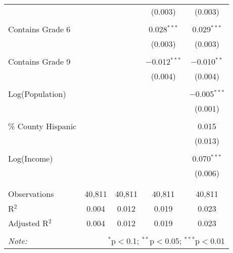 \begin{table}[!htbp]
\begin{tabular}{@{\extracolsep{-2pt}}lcccc}
  &  &  & (0.003) & (0.003) \\ 
  & & & & \\ 
 Contains Grade 6 &  &  & 0.028$^{***}$ & 0.029$^{***}$ \\ 
  &  &  & (0.003) & (0.003) \\ 
  & & & & \\ 
 Contains Grade 9 &  &  & $-$0.012$^{***}$ & $-$0.010$^{**}$ \\ 
  &  &  & (0.004) & (0.004) \\ 
  & & & & \\ 
 Log(Population) &  &  &  & $-$0.005$^{***}$ \\ 
  &  &  &  & (0.001) \\ 
  & & & & \\ 
 \% County Hispanic &  &  &  & 0.015 \\ 
  &  &  &  & (0.013) \\ 
  & & & & \\ 
 Log(Income) &  &  &  & 0.070$^{***}$ \\ 
  &  &  &  & (0.006) \\ 
  & & & & \\ 
\hline \\[-1.8ex] 
Observations & 40,811 & 40,811 & 40,811 & 40,811 \\ 
R$^{2}$ & 0.004 & 0.012 & 0.019 & 0.023 \\ 
Adjusted R$^{2}$ & 0.004 & 0.012 & 0.019 & 0.023 \\ 
\hline 
\hline \\[-1.8ex] 
\textit{Note:}  & \multicolumn{4}{r}{$^{*}$p$<$0.1; $^{**}$p$<$0.05; $^{***}$p$<$0.01} \\ 
\end{tabular} 
\end{table} 
